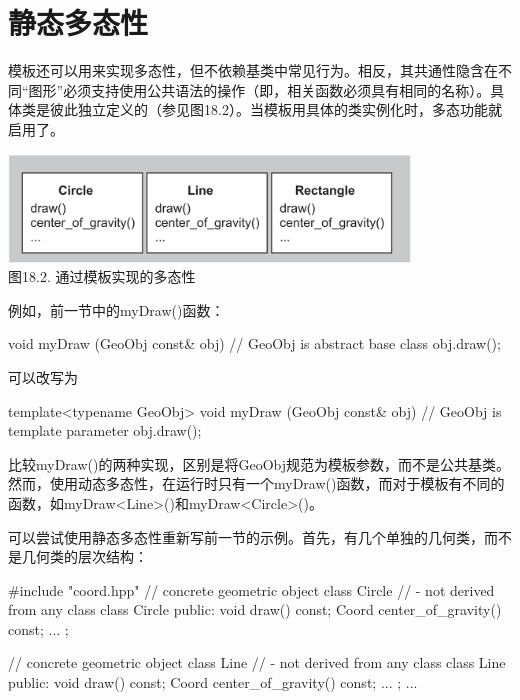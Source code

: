 \section{静态多态性}

模板还可以用来实现多态性，但不依赖基类中常见行为。相反，其共通性隐含在不同“图形”必须支持使用公共语法的操作（即，相关函数必须具有相同的名称）。具体类是彼此独立定义的（参见图18.2）。当模板用具体的类实例化时，多态功能就启用了。

\begin{center}
\includegraphics[width=0.8\textwidth]{part3/ch18/images/2.png} \\
图18.2. 通过模板实现的多态性
\end{center}

例如，前一节中的myDraw()函数：

\begin{cpp}
void myDraw (GeoObj const& obj) // GeoObj is abstract base class
{
	obj.draw();
}
\end{cpp}

可以改写为

\begin{cpp}
template<typename GeoObj>
void myDraw (GeoObj const& obj) // GeoObj is template parameter
{
	obj.draw();
}
\end{cpp}

比较myDraw()的两种实现，区别是将GeoObj规范为模板参数，而不是公共基类。然而，使用动态多态性，在运行时只有一个myDraw()函数，而对于模板有不同的函数，如myDraw<Line>()和myDraw<Circle>()。

可以尝试使用静态多态性重新写前一节的示例。首先，有几个单独的几何类，而不是几何类的层次结构：

\begin{cpp}
#include "coord.hpp"
// concrete geometric object class Circle
// - not derived from any class
class Circle {
	public:
	void draw() const;
	Coord center_of_gravity() const;
	...
};

// concrete geometric object class Line
// - not derived from any class
class Line {
	public:
	void draw() const;
	Coord center_of_gravity() const;
	...
};
...
\end{cpp}

